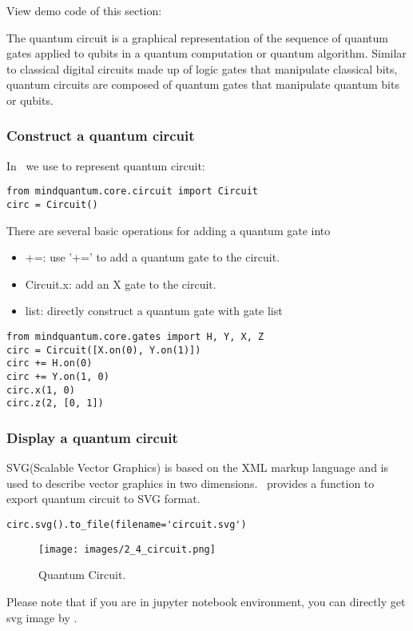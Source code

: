 View demo code of this section: 

The quantum circuit is a graphical representation of the sequence of quantum gates applied to qubits in a quantum computation or quantum algorithm. Similar to classical digital circuits made up of logic gates that manipulate classical bits, quantum circuits are composed of quantum gates that manipulate quantum bits or qubits.

\subsubsection{Construct a quantum circuit}
In \MindQuantum\ we use \Circuit to represent quantum circuit:

\begin{lstlisting}
from mindquantum.core.circuit import Circuit
circ = Circuit()
\end{lstlisting}

There are several basic operations for adding a quantum gate into \Circuit
\begin{itemize}
    \item +=: use '+=' to add a quantum gate to the circuit.
    \item Circuit.x: add an X gate to the circuit.
    \item list: directly construct a quantum gate with gate list
\end{itemize}
\begin{lstlisting}
from mindquantum.core.gates import H, Y, X, Z
circ = Circuit([X.on(0), Y.on(1)])
circ += H.on(0)
circ += Y.on(1, 0)
circ.x(1, 0)
circ.z(2, [0, 1])
\end{lstlisting}

\subsubsection{Display a quantum circuit}
SVG(Scalable Vector Graphics) is based on the XML markup language and is used to describe vector graphics in two dimensions. \MindQuantum\ provides a function to export quantum circuit to SVG format.
\begin{lstlisting}
circ.svg().to_file(filename='circuit.svg')
\end{lstlisting}
\begin{figure}[h]
    \begin{center}
        \texttt{[image: images/2\_4\_circuit.png]}
    \end{center}
    \caption{Quantum Circuit.}
\end{figure}
Please note that if you are in jupyter notebook environment, you can directly get svg image by .


